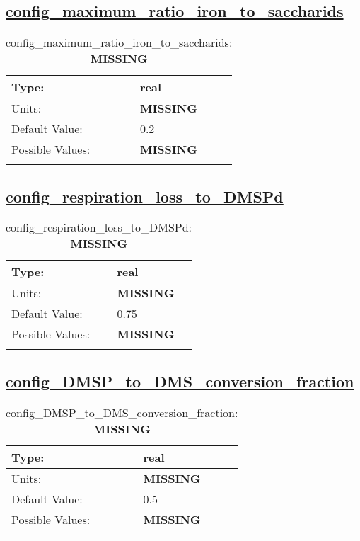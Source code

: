 \subsection[config\_maximum\_ratio\_iron\_to\_saccharids]{\hyperref[sec:nm_tab_biogeochemistry]{config\_maximum\_ratio\_iron\_to\_saccharids}}
\label{subsec:nm_sec_config_maximum_ratio_iron_to_saccharids}
\begin{center}
\begin{longtable}{| p{2.0in} || p{4.0in} |}
    \hline
    Type: & real \\
    \hline
    Units: & {\bf \color{red} MISSING} \\
    \hline
    Default Value: & 0.2 \\
    \hline
    Possible Values: & {\bf \color{red} MISSING} \\
    \hline
    \caption{config\_maximum\_ratio\_iron\_to\_saccharids: {\bf \color{red} MISSING}}
\end{longtable}
\end{center}
\subsection[config\_respiration\_loss\_to\_DMSPd]{\hyperref[sec:nm_tab_biogeochemistry]{config\_respiration\_loss\_to\_DMSPd}}
\label{subsec:nm_sec_config_respiration_loss_to_DMSPd}
\begin{center}
\begin{longtable}{| p{2.0in} || p{4.0in} |}
    \hline
    Type: & real \\
    \hline
    Units: & {\bf \color{red} MISSING} \\
    \hline
    Default Value: & 0.75 \\
    \hline
    Possible Values: & {\bf \color{red} MISSING} \\
    \hline
    \caption{config\_respiration\_loss\_to\_DMSPd: {\bf \color{red} MISSING}}
\end{longtable}
\end{center}
\subsection[config\_DMSP\_to\_DMS\_conversion\_fraction]{\hyperref[sec:nm_tab_biogeochemistry]{config\_DMSP\_to\_DMS\_conversion\_fraction}}
\label{subsec:nm_sec_config_DMSP_to_DMS_conversion_fraction}
\begin{center}
\begin{longtable}{| p{2.0in} || p{4.0in} |}
    \hline
    Type: & real \\
    \hline
    Units: & {\bf \color{red} MISSING} \\
    \hline
    Default Value: & 0.5 \\
    \hline
    Possible Values: & {\bf \color{red} MISSING} \\
    \hline
    \caption{config\_DMSP\_to\_DMS\_conversion\_fraction: {\bf \color{red} MISSING}}
\end{longtable}
\end{center}
